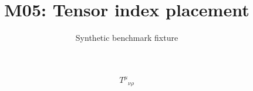 \documentclass{article}
\title{M05: Tensor index placement}
\author{Synthetic benchmark fixture}
\date{}
\begin{document}
\maketitle
\[T^{\mu}{}_{\nu\rho}\]
\end{document}
